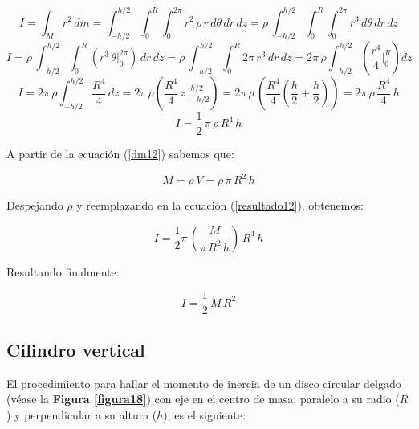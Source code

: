 \documentclass[letter,oneside,11pt]{article}
\begin{document}
\begin{equation*}
    I = \int_{M} r^2\, dm = \int_{-h/2}^{h/2} \int_{0}^{R} \int_{0}^{2\pi} r^2\, \rho\, r\, d\theta\, dr\, dz = \rho\, \int_{-h/2}^{h/2} \int_{0}^{R} \int_{0}^{2\pi} r^3\, d\theta\, dr\, dz
\end{equation*}
\begin{equation*}
    I = \rho\, \int_{-h/2}^{h/2} \int_{0}^{R} (r^3\, \theta \Biggr|_{0}^{2\pi})\, dr\, dz = \rho\, \int_{-h/2}^{h/2} \int_{0}^{R} 2\pi\, r^3\, dr\, dz = 2\pi\, \rho \int_{-h/2}^{h/2} \left(\frac{r^4}{4}\Biggr|_{0}^{R}\right) dz
\end{equation*}
\begin{equation*}
    I = 2\pi\, \rho \int_{-h/2}^{h/2} \frac{R^4}{4}\, dz = 2\pi\, \rho \left(\frac{R^4}{4}\, z\,\Biggr|_{-h/2}^{h/2}\right) = 2\pi\, \rho\, \left( \frac{R^4}{4} \left( \frac{h}{2} + \frac{h}{2} \right)  \right) = 2\pi\, \rho\, \frac{R^4}{4}\, h
\end{equation*}
\begin{equation}
    I = \frac{1}{2}\, \pi\, \rho\, R^4\, h
\label{resultado12}
\end{equation}

A partir de la ecuación (\ref{dm12}) sabemos que:

\begin{equation*}
    M = \rho\, V = \rho\, \pi\, R^2\, h
\end{equation*}

Despejando $\rho$ y reemplazando en la ecuación (\ref{resultado12}), obtenemos:

\begin{equation*}
    I = \frac{1}{2} \pi\, (\frac{M}{\pi\, R^2\, h})\, R^4\, h
\end{equation*}

Resultando finalmente:

\begin{equation}
    I = \frac{1}{2}\, M\, R^2
\end{equation}

\subsection{Cilindro vertical}
El procedimiento para hallar el momento de inercia de un disco circular delgado
(véase la \textbf{Figura \ref{figura18}}) con eje en el centro de masa,
paralelo a su radio ($R$) y perpendicular a su altura ($h$), es el siguiente:
\end{document}
